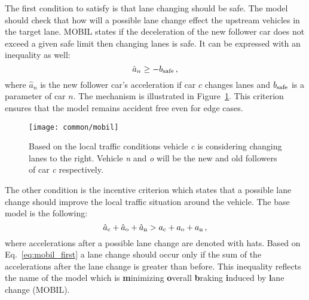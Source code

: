		The first condition to satisfy is that lane changing should be safe. The model should check that how will a possible lane change effect the upstream vehicles in the target lane. MOBIL \cite{arne2} states if the deceleration of the new follower car does not exceed a given safe limit then changing lanes is safe. It can be expressed with an inequality as well:
		\begin{equation}
			\hat{a}_{n}\geq -b_{\rm safe}\,,
		\end{equation}
		where $\hat{a}_{n}$ is the new follower car's acceleration if car $c$ changes lanes and $b_{\rm safe}$ is a parameter of car $n$. The mechanism is illustrated in Figure~\ref{fig:mobil}. This criterion ensures that the model remains accident free even for edge cases.
			\begin{figure}
				\centering
				\texttt{[image: common/mobil]}
				\caption{Based on the local traffic conditions vehicle \textit{c} is considering changing lanes to the right. Vehicle \textit{n} and \textit{o} will be the new and old followers of car \textit{c} respectively.}
				\label{fig:mobil}
			\end{figure}

			The other condition is the incentive criterion which states that a possible lane change should improve the local traffic situation around the vehicle. The base model is the following:
			\begin{equation}
				\hat{a}_{\rm c} + \hat{a}_{\rm o} + \hat{a}_{\rm n} > a_{\rm c} + a_{\rm o} + a_{\rm n}\,,
				\label{eq:mobil_first}
			\end{equation}
			where accelerations after a possible lane change are denoted with hats.
			Based on Eq.~\eqref{eq:mobil_first} a lane change should occur only if the sum of the accelerations after the lane change is greater than before. This inequality reflects the name of the model which is \textbf{m}inimizing \textbf{o}verall \textbf{b}raking \textbf{i}nduced by \textbf{l}ane change (MOBIL).

